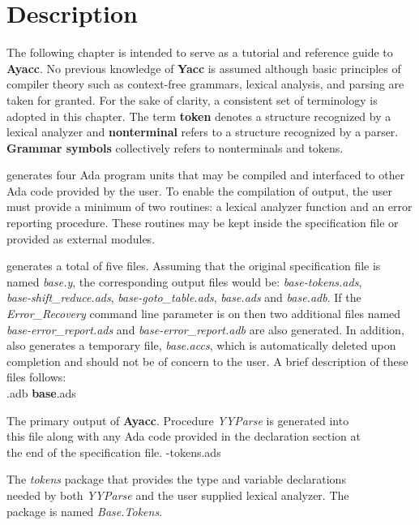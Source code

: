 \section{Description}

The following chapter is intended to serve as a
tutorial and reference guide to {\bf Ayacc\rm}.  No previous knowledge
of {\bf Yacc} is assumed although basic principles of compiler
theory such as context-free grammars, lexical analysis,
and parsing are taken for granted.  For the
sake of clarity, a consistent set of terminology is
adopted in this chapter.  The term {\bf token} denotes a structure
recognized by a lexical analyzer and {\bf nonterminal}
refers to a structure recognized by a parser.  {\bf Grammar symbols}
collectively refers to nonterminals and tokens.

\ayacc generates four Ada program units that may be compiled and
interfaced to other Ada code provided by the user.  To enable
the compilation of \ayacc output, the user
must provide a minimum of two routines: a lexical analyzer
function
and an error reporting procedure.  These routines may be
kept inside the specification file or provided as
external modules.

\ayacc generates a total of five files.  Assuming that the original
specification file is named
{\it base.y},
the corresponding \ayacc output files would be:
{\it base-tokens.ads},\\
{\it base-shift\_reduce.ads},
{\it base-goto\_table.ads},
{\it base.ads} and {\it base.adb}.  If the {\it Error\_Recovery} command line parameter is
on then two additional files named {\it base-error\_report.ads} and
{\it base-error\_report.adb} are also generated.
In addition, \ayacc also generates a temporary file,
{\it base.accs},
which is automatically deleted upon completion and should not be of concern
to the user.  A brief description of these files follows:
\smallskip\\
.adb {\bf base}.ads

The primary output of {\bf Ayacc}.  Procedure {\it YYParse} is generated into\\
\indent this file along with any Ada code provided in the
declaration section at\\
\indent the end of the specification file.
\newpage
{}-tokens.ads

\indent The {\it tokens} package that provides the type and variable
declarations\\
\indent  needed by both {\it YYParse} and the user supplied lexical
analyzer.  The\\
\indent  package is named {\it Base.Tokens}.


